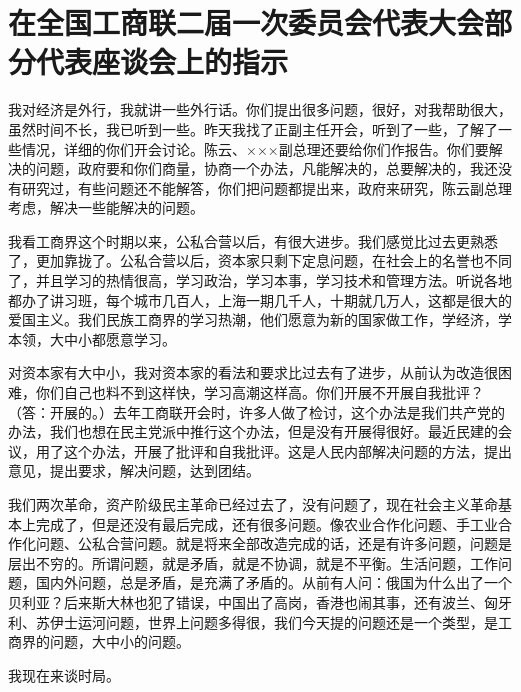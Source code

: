 \section[在全国工商联二届一次委员会代表大会部分代表座谈会上的指示（一九五六年十二月八日）]{在全国工商联二届一次委员会代表大会部分代表座谈会上的指示}


我对经济是外行，我就讲一些外行话。你们提出很多问题，很好，对我帮助很大，虽然时间不长，我已听到一些。昨天我找了正副主任开会，听到了一些，了解了一些情况，详细的你们开会讨论。陈云、×××副总理还要给你们作报告。你们要解决的问题，政府要和你们商量，协商一个办法，凡能解决的，总要解决的，我还没有研究过，有些问题还不能解答，你们把问题都提出来，政府来研究，陈云副总理考虑，解决一些能解决的问题。

我看工商界这个时期以来，公私合营以后，有很大进步。我们感觉比过去更熟悉了，更加靠拢了。公私合营以后，资本家只剩下定息问题，在社会上的名誉也不同了，并且学习的热情很高，学习政治，学习本事，学习技术和管理方法。听说各地都办了讲习班，每个城市几百人，上海一期几千人，十期就几万人，这都是很大的爱国主义。我们民族工商界的学习热潮，他们愿意为新的国家做工作，学经济，学本领，大中小都愿意学习。

对资本家有大中小，我对资本家的看法和要求比过去有了进步，从前认为改造很困难，你们自己也料不到这样快，学习高潮这样高。你们开展不开展自我批评？（答：开展的。）去年工商联开会时，许多人做了检讨，这个办法是我们共产党的办法，我们也想在民主党派中推行这个办法，但是没有开展得很好。最近民建的会议，用了这个办法，开展了批评和自我批评。这是人民内部解决问题的方法，提出意见，提出要求，解决问题，达到团结。

我们两次革命，资产阶级民主革命已经过去了，没有问题了，现在社会主义革命基本上完成了，但是还没有最后完成，还有很多问题。像农业合作化问题、手工业合作化问题、公私合营问题。就是将来全部改造完成的话，还是有许多问题，问题是层出不穷的。所谓问题，就是矛盾，就是不协调，就是不平衡。生活问题，工作问题，国内外问题，总是矛盾，是充满了矛盾的。从前有人问：俄国为什么出了一个贝利亚？后来斯大林也犯了错误，中国出了高岗，香港也闹其事，还有波兰、匈牙利、苏伊士运河问题，世界上问题多得很，我们今天提的问题还是一个类型，是工商界的问题，大中小的问题。

我现在来谈时局。

